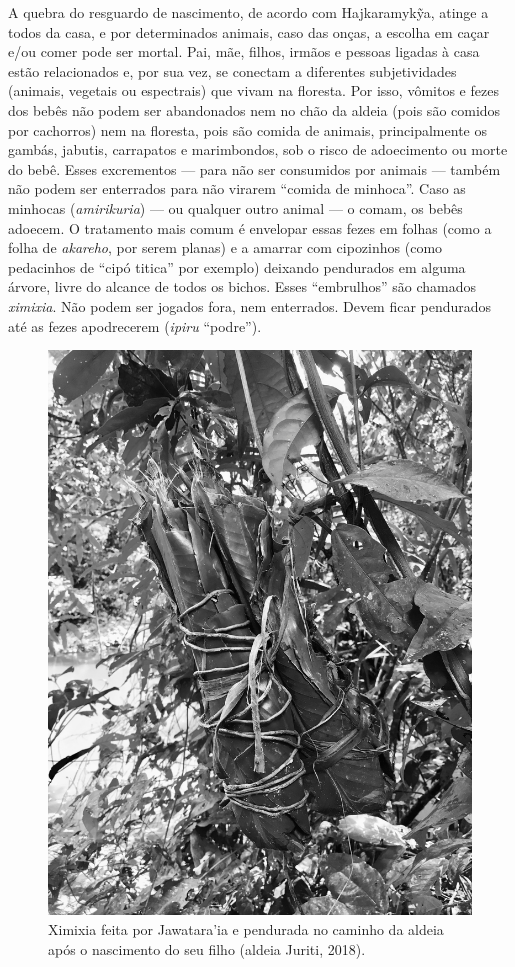 A quebra do resguardo de nascimento, de acordo com Hajkaramykỹa, atinge
a todos da casa, e por determinados animais, caso das onças, a escolha
em caçar e/ou comer pode ser mortal. Pai, mãe, filhos, irmãos e pessoas
ligadas à casa estão relacionados e, por sua vez, se conectam a
diferentes subjetividades (animais, vegetais ou espectrais) que vivam na
floresta. Por isso, vômitos e fezes dos bebês não podem ser abandonados
nem no chão da aldeia (pois são comidos por cachorros) nem na floresta,
pois são comida de animais, principalmente os gambás, jabutis,
carrapatos e marimbondos, sob o risco de adoecimento ou morte do bebê.
Esses excrementos --- para não ser consumidos por animais --- também não
podem ser enterrados para não virarem ``comida de minhoca''. Caso as
minhocas (\emph{amirikuria}) --- ou qualquer outro animal --- o comam, os
bebês adoecem. O tratamento mais comum é envelopar essas fezes em folhas
(como a folha de \emph{akareho}, por serem planas) e a amarrar com
cipozinhos (como pedacinhos de ``cipó titica'' por exemplo) deixando
pendurados em alguma árvore, livre do alcance de todos os bichos. Esses
``embrulhos'' são chamados \emph{ximixia}. Não podem ser jogados fora,
nem enterrados. Devem ficar pendurados até as fezes apodrecerem
(\emph{ipiru} ``podre'').

\begin{figure}[H]
\centering
  \includegraphics[width=\textwidth]{./imgs/IMG_4613}
\caption{Ximixia feita por Jawatara'ia e pendurada no caminho da aldeia após o
nascimento do seu filho (aldeia Juriti, 2018).}
\end{figure}

